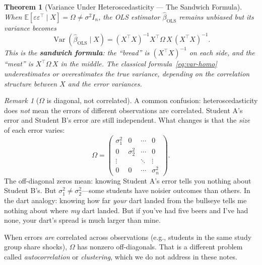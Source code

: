 \documentclass[11pt,a4paper]{article}
\theoremstyle{definition}
\theoremstyle{plain}
\newtheorem{theorem}{Theorem}[section]
\theoremstyle{remark}
\newtheorem{remark}{Remark}[section]
\newcommand{\E}{\mathbb{E}}
\newcommand{\Var}{\operatorname{Var}}
\newcommand{\bols}{\hat{\beta}_{\text{OLS}}}
\begin{document}
\begin{theorem}[Variance Under Heteroscedasticity --- The Sandwich Formula]\label{thm:sandwich}
When $\E[\varepsilon\varepsilon^\top \mid X] = \Omega \neq \sigma^2 I_n$, the OLS estimator $\bols$ remains \emph{unbiased} but its variance becomes
\begin{equation}\label{eq:var-hetero}
  \Var(\bols \mid X) = (X^\top X)^{-1} X^\top \Omega\, X\, (X^\top X)^{-1}.
\end{equation}
This is the \textbf{sandwich formula}: the ``bread'' is $(X^\top X)^{-1}$ on each side, and the ``meat'' is $X^\top \Omega\, X$ in the middle.
The classical formula~\eqref{eq:var-homo} underestimates or overestimates the true variance, depending on the correlation structure between $X$ and the error variances.
\end{theorem}

\begin{remark}[$\Omega$ is diagonal, not correlated]
A common confusion: heteroscedasticity does \emph{not} mean the errors of different observations are correlated. Student A's error and Student B's error are still independent. What changes is that the \emph{size} of each error varies:
\[
  \Omega = \begin{pmatrix} \sigma_1^2 & 0 & \cdots & 0 \\ 0 & \sigma_2^2 & \cdots & 0 \\ \vdots & & \ddots & \vdots \\ 0 & 0 & \cdots & \sigma_n^2 \end{pmatrix}.
\]
The off-diagonal zeros mean: knowing Student A's error tells you nothing about Student B's. But $\sigma_1^2 \neq \sigma_2^2$---some students have noisier outcomes than others. In the dart analogy: knowing how far \emph{your} dart landed from the bullseye tells me nothing about where \emph{my} dart landed. But if you've had five beers and I've had none, your dart's spread is much larger than mine.

When errors \emph{are} correlated across observations (e.g., students in the same study group share shocks), $\Omega$ has nonzero off-diagonals. That is a different problem called \emph{autocorrelation} or \emph{clustering}, which we do not address in these notes.
\end{remark}
\end{document}

